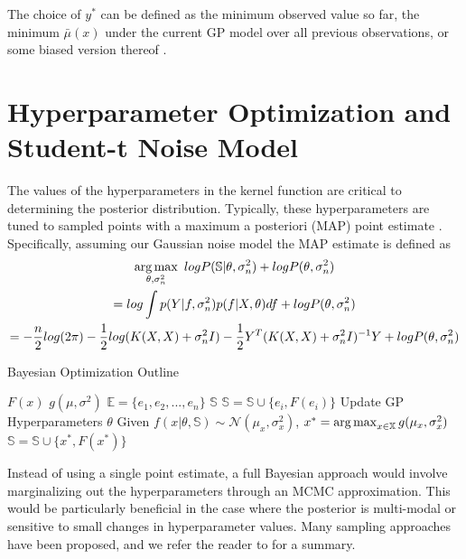 The choice of $y^*$ can be defined as the minimum observed value so far, the minimum $\bar{\mu}(x)$ under the current GP model over all previous observations, or some biased version thereof \citep{Lizotte:2008:PBO:1626686}. 

\section{Hyperparameter Optimization and Student-t Noise Model}
\label{gp_hyperparam}
The values of the hyperparameters in the kernel function are critical to determining the posterior distribution. Typically, these hyperparameters are tuned to sampled points with a maximum a posteriori (MAP) point estimate \citep{NIPS2012_4522,GPstuff}. Specifically, assuming our Gaussian noise model the MAP estimate is defined as
\begin{gather}
\operatorname*{arg\,max}_{\theta, \sigma_n^2} \text{ } log P(\mathbb{S}\vert \theta, \sigma_n^2) + log P(\theta, \sigma_n^2)\\
=log \int p(Y\vert f, \sigma_n^2)p(f\vert X,\theta)df + log P(\theta, \sigma_n^2)\nonumber\\
= -\frac{n}{2}log(2\pi) - \frac{1}{2}log(K(X,X) + \sigma_n^2 I) - \frac{1}{2}Y^T(K(X,X) + \sigma_n^2 I)^{-1}Y + log P(\theta, \sigma_n^2)\nonumber
\end{gather}


\begin{algorithm}[t]
\caption{Bayesian Optimization Outline}
\label{alg:bayesopt}
\begin{algorithmic}
\State {} $F(x)$
\State {} $g(\mu, \sigma^2)$
\State {} $\mathbb{E} = \{e_1, e_2, ..., e_n\}$
\State {} $\mathbb{S}$
  \State $\mathbb{S} = \mathbb{S} \cup \{e_i, F(e_i)\}$
\End
{}
  \State Update GP Hyperparameters $\theta$
  \State Given $f(x\vert \theta, \mathbb{S}) \sim \mathcal{N}(\mu_x, \sigma_x^2)$,
  \State $x^* = \operatorname*{arg\,max}_{x \in \mathbb{X}} g(\mu_x, \sigma_x^2)$
  \State $\mathbb{S} = \mathbb{S} \cup \{x^*, F(x^*)\}$
\End
\end{algorithmic}
\end{algorithm}


Instead of using a single point estimate, a full Bayesian approach would involve marginalizing out the hyperparameters through an MCMC approximation. This would be particularly beneficial in the case where the posterior is multi-modal or sensitive to small changes in hyperparameter values. Many sampling approaches have been proposed, and we refer the reader to \cite[Chapter~14]{barber2011bayesian} for a summary. 

